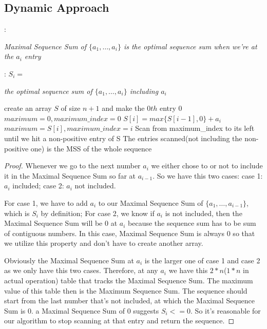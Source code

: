 \documentclass[11pt]{article}
\begin{document}
\subsection{Dynamic Approach}
: {\it Maximal Sequence Sum of $\{a_1, \dots, a_i\}$ is the optimal sequence sum when we're at the $a_i$ entry

: $S_i = ${\it the optimal sequence sum of $\{a_1, \dots, a_i\}$ including $a_i$


\begin{algorithm}
\begin{algorithmic}
  \State create an array $S$ of size $n+1$ and make the $0th$ entry $0$
  \State $maximum = 0, maximum\_index = 0$
    \State $S[i] = max\{S[i-1], 0\} + a_i$
      \State $maximum = S[i], maximum\_index = i$
    \EndIf
  \EndFor
  \State Scan from maximum\_index to its left until we hit a non-positive entry of S
  \State The entries scanned(not including the non-positive one) is the MSS of the whole sequence
\end{algorithmic}
\end{algorithm}

\begin{proof}
Whenever we go to the next number $a_i$ we either chose to or not to include it in the Maximal Sequence Sum so far at $a_{i-1}$. So we have this two cases: case 1: $a_i$ included; case 2: $a_i$ not included.

For case 1, we have to add $a_i$ to our Maximal Sequence Sum of $\{a_1, \dots, a_{i-1}\}$, which is $S_i$ by definition; For case 2, we know if $a_i$ is not included, then the Maximal Sequence Sum will be $0$ at $a_i$ because the sequence sum has to be sum of contiguous numbers. In this case, Maximal Sequence Sum is always $0$ so that we utilize this property and don't have to create another array.

Obviously the Maximal Sequence Sum at $a_i$ is the larger one of case 1 and case 2 as we only have this two cases. Therefore, at any $a_i$ we have this $2*n$($1*n$ in actual operation) table that tracks the Maximal Sequence Sum. The maximum value of this table then is the Maximum Sequence Sum. The sequence should start from the last number that's not included, at which the Maximal Sequence Sum is $0$. a Maximal Sequence Sum of $0$ suggests $S_i <= 0$. So it's reasonable for our algorithm to stop scanning at that entry and return the sequence.
\end{proof}

}}
\end{document}

